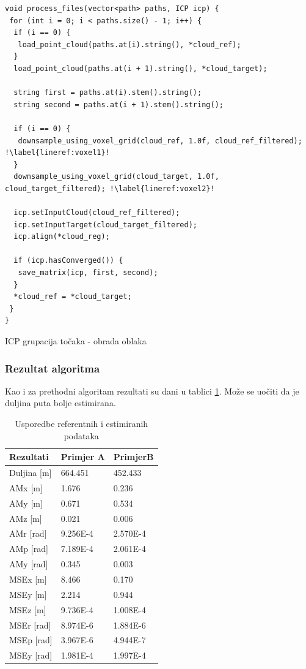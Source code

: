 \begin{listing}[H]
  \begin{verbatim}
void process_files(vector<path> paths, ICP icp) {
 for (int i = 0; i < paths.size() - 1; i++) {
  if (i == 0) {
   load_point_cloud(paths.at(i).string(), *cloud_ref);
  }
  load_point_cloud(paths.at(i + 1).string(), *cloud_target);

  string first = paths.at(i).stem().string(); 
  string second = paths.at(i + 1).stem().string();

  if (i == 0) {
   downsample_using_voxel_grid(cloud_ref, 1.0f, cloud_ref_filtered); !\label{lineref:voxel1}!
  }
  downsample_using_voxel_grid(cloud_target, 1.0f, cloud_target_filtered); !\label{lineref:voxel2}!

  icp.setInputCloud(cloud_ref_filtered);
  icp.setInputTarget(cloud_target_filtered);
  icp.align(*cloud_reg);

  if (icp.hasConverged()) {
   save_matrix(icp, first, second);
  }
  *cloud_ref = *cloud_target;
 }
}
  \end{verbatim}
  \caption{ICP grupacija točaka - obrada oblaka}
  \label{coderef:voxel_grouping}
\end{listing}

\subsubsection{Rezultat algoritma}
Kao i za prethodni algoritam rezultati su dani u tablici \ref{res:ref_est_table_vox}. Može se uočiti da je duljina puta bolje estimirana.

\begin{table}[H]
  \centering
  \begin{tabular}{ |p{3cm}| |p{3cm}|p{3cm}| }
    \hline
    Rezultati& Primjer A& PrimjerB\\
    \hline
    Duljina [m]& 664.451& 452.433\\
    AMx [m]& 1.676& 0.236\\
    AMy [m]& 0.671& 0.534\\
    AMz [m]& 0.021& 0.006\\
    AMr [rad]& 9.256E-4& 2.570E-4\\
    AMp [rad]& 7.189E-4& 2.061E-4\\
    AMy [rad]& 0.345& 0.003\\
    \hline
    MSEx [m]& 8.466& 0.170\\
    MSEy [m]& 2.214& 0.944\\
    MSEz [m]& 9.736E-4& 1.008E-4\\
    MSEr [rad]& 8.974E-6& 1.884E-6\\
    MSEp [rad]& 3.967E-6& 4.944E-7\\
    MSEy [rad]& 1.981E-4& 1.997E-4\\
    \hline
  \end{tabular}
  \caption{Usporedbe referentnih i estimiranih podataka}
  \label{res:ref_est_table_vox}
\end{table}
\pagebreak

